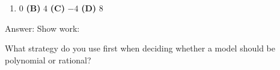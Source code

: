 \documentclass[10pt]{article}
\begin{document}
\begin{enumerate}[itemsep=18pt]
      \medskip
      \begin{enumerate}[label=(\Alph*), itemsep=3pt]
        \item $0$ \qquad \textbf{(B)} $4$ \qquad \textbf{(C)} $-4$ \qquad \textbf{(D)} $8$
      \end{enumerate}

      \vspace{0.06in}
      Answer: \blank{1.5cm} \quad Show work:

      \vspace{0.08in}

\end{enumerate}

\begin{reflectionbox}
What strategy do you use first when deciding whether a model should be polynomial or rational?
\end{reflectionbox}
\end{document}
